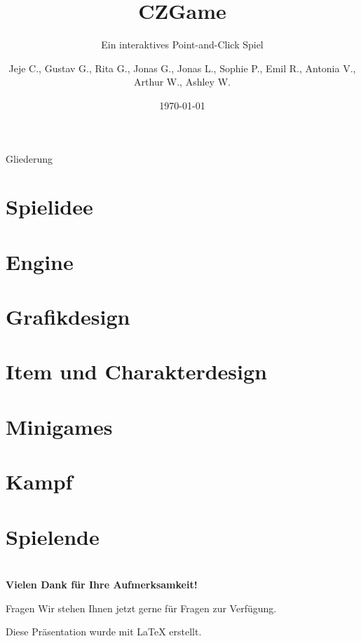 \documentclass{beamer}
\title{CZGame}
\subtitle{Ein interaktives Point-and-Click Spiel}
\author{Jeje C., Gustav G., Rita G., Jonas G., Jonas L., Sophie P., Emil R., Antonia V., Arthur W., Ashley W.}
\institute[CZG]{Carl-Zeiss-Gymnasium Jena}
\date{\today}
\begin{document}
	
	\begin{frame}
		\titlepage
	\end{frame}
	
	\begin{frame}{Gliederung}
		\tableofcontents[pausesections]
	\end{frame}
	
	\section{Spielidee}
	
	
	\section{Engine}
	
	
	\section{Grafikdesign}
	
	
	\section{Item und Charakterdesign}
	
	
	\section{Minigames}
	
	
	\section{Kampf}
	

	\section{Spielende}
	


	
\section*{}
	
	\begin{frame}
		\begin{center}
			\Large\textbf{Vielen Dank für Ihre Aufmerksamkeit!}
		\end{center}
		
		\vspace{0,5cm}
		
		\begin{block}{Fragen}
			Wir stehen Ihnen jetzt gerne für Fragen zur Verfügung.
		\end{block}
		
		\vspace{1cm}
		
		\begin{flushright}
			\footnotesize{Diese Präsentation wurde mit \LaTeX{} erstellt.}
		\end{flushright}
	\end{frame}
	
\end{document}
